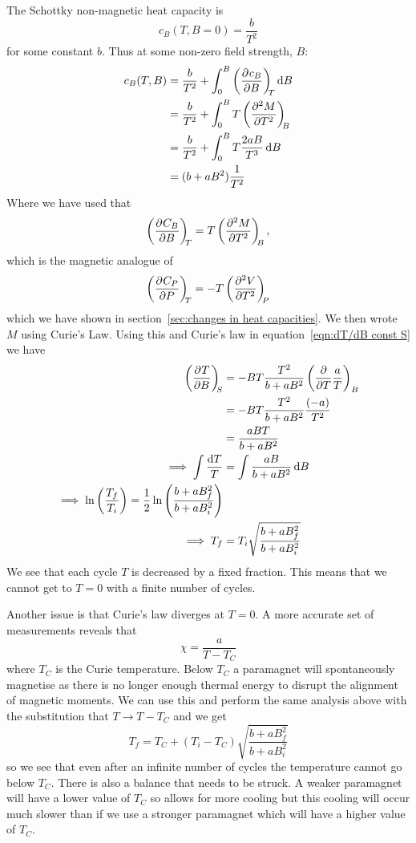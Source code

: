     The Schottky non-magnetic heat capacity is
    \[c_B(T, B = 0) = \frac{b}{T^2}\]
    for some constant \(b\).
    Thus at some non-zero field strength, \(B\):
    \begin{align*}
        c_B(T, B) &= \frac{b}{T^2} + \int_0^B \left(\pdv[]{c_B}{B}\right)_{\!\!{T}} \dd{B}\\
        &= \frac{b}{T^2} + \int_0^B T\left(\pdv[2]{M}{T}\right)_{\!\!{B}}\\
        &= \frac{b}{T^2} + \int_0^B T\frac{2aB}{T^3}\dd{B}\\
        &= (b + aB^2)\frac{1}{T^2}
    \end{align*}
    Where we have used that
    \[\left(\pdv[]{C_B}{B}\right)_{\!\!{T}} = T\left(\pdv[2]{M}{T}\right)_{\!\!{B}},\]
    which is the magnetic analogue of
    \[\left(\pdv[]{C_P}{P}\right)_{\!\!{T}} = -T\left(\pdv[2]{V}{T}\right)_{\!\!{P}}\]
    which we have shown in section~\ref{sec:changes in heat capacities}.
    We then wrote \(M\) using Curie's Law.
    Using this and Curie's law in equation~\ref{eqn:dT/dB const S} we have
    \begin{align*}
        \left(\pdv[]{T}{B}\right)_{\!\!{S}} &= -BT\frac{T^2}{b + aB^2}\left(\pdv{T}\frac{a}{T}\right)_B\\
        &= -BT\frac{T^2}{b + aB^2}\frac{(-a)}{T^2}\\
        &= \frac{aBT}{b + aB^2}\\
        \implies \int \frac{\dd{T}}{T} &= \int \frac{aB}{b + aB^2}\dd{B}\\
        \implies \ln\left(\frac{T_f}{T_i}\right) = \frac{1}{2}\ln\left(\frac{b + aB_f^2}{b + aB_i^2}\right)\\
        \implies T_f &= T_i\sqrt{\frac{b + aB_f^2}{b + aB_i^2}}
    \end{align*}
    We see that each cycle \(T\) is decreased by a fixed fraction.
    This means that we cannot get to \(T = 0\) with a finite number of cycles.
    
    Another issue is that Curie's law diverges at \(T = 0\).
    A more accurate set of measurements reveals that
    \[\chi = \frac{a}{T - T_C}\]
    where \(T_C\) is the Curie temperature.
    Below \(T_C\) a paramagnet will spontaneously magnetise as there is no longer enough thermal energy to disrupt the alignment of magnetic moments.
    We can use this and perform the same analysis above with the substitution that \(T \rightarrow T - T_C\) and we get
    \[T_f = T_C + (T_i - T_C)\sqrt{\frac{b + aB_f^2}{b + aB_i^2}}\]
    so we see that even after an infinite number of cycles the temperature cannot go below \(T_C\).
    There is also a balance that needs to be struck.
    A weaker paramagnet will have a lower value of \(T_C\) so allows for more cooling but this cooling will occur much slower than if we use a stronger paramagnet which will have a higher value of \(T_C\).
    
